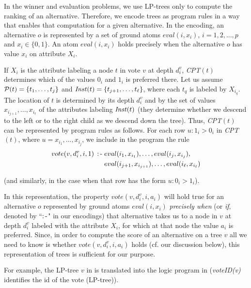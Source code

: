 In the winner and evaluation problems, we use LP-trees only to compute
the ranking of an alternative. Therefore, we encode trees as program rules
in a way that enables that computation for a given alternative. In the
encoding, an alternative $o$ is represented by a set of ground atoms 
$eval(i,x_i)$, $i=1,2,\ldots,p$ and $x_i \in\{0,1\}$. An atom $eval(i,x_i)$
holds precisely when the alternative $o$ has value $x_i$ on attribute $X_i$.

If $X_i$ is the attribute labeling a node $t$ in vote $v$
at depth $d^v_i$, \textit{CPT}$(t)$ determines
which of the values $0_i$ and $1_i$ is preferred there. Let us assume
$\mathcal{P}(t) = \{t_1,\ldots, t_j\}$ and $\mathit{Inst}(t)=
\{t_{j+1},\ldots, t_\ell\}$, where each $t_q$ is labeled by $X_{i_q}$.
The location of $t$ is determined by its
depth $d^v_i$ and by the set of values $x_{i_{j+1}},\ldots,x_{i_\ell}$ of the
attributes labeling $\mathit{Inst}(t)$ (they determine whether we descend to the left or
to the right child as we descend down the tree). Thus, \textit{CPT}$(t)$ can be
represented by program rules as follows. For each row $u : 1_i > 0_i$
in \textit{CPT}$(t)$, where $u=x_{i_1},\ldots,x_{i_j}$, we include in the program
the rule
\begin{equation} \label{eq:localPrefASP}
\begin{split}
  \small
  vote(v,d^v_i,i,1) \; \operatorname{:-} \; &eval(i_1,x_{i_1}), \ldots, eval(i_j,x_{i_j}), \\
    &eval(i_{j+1},x_{i_{j+1}}), \ldots, eval(i_\ell,x_{i_\ell})
\end{split}
  \end{equation}

(and similarly, in the case when that row has the form $u : 0_i > 1_i$).
 
In this representation, the property $vote(v,d^v_i,i,a_i)$ will hold true
for an alternative $o$ represented by ground atoms $eval(i,x_i)$ \textit{precisely
when} (or \textit{if}, denoted by ``$\operatorname{:-}$" in our encodings) that alternative 
takes us to a node in $v$ at depth $d^v_i$ labeled with 
the attribute $X_i$, for which at that node the value $a_i$ is preferred.
Since, in order to compute the score of an
alternative on a tree $v$ all we need to know is whether $vote(v,d^v_i,i,a_i)$
holds (cf. our discussion below), this representation of trees is 
sufficient for our purpose.

For example, the LP-tree $v$ in  
is translated into the logic program in  
(\textit{voteID(v)} identifies the id of the vote (LP-tree)).

